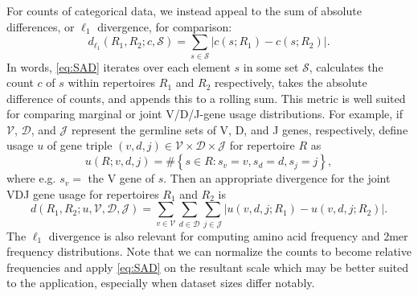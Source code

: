 \documentclass{article}
\begin{document}
For counts of categorical data, we instead appeal to the sum of absolute differences, or $\ell_1$ divergence, for comparison:
\begin{equation}\label{eq:SAD}
    d_{\ell_1}(R_1, R_2; c, \mathcal S) = \sum_{s \in \mathcal S} \left| c(s; R_1) - c(s; R_2) \right|.
\end{equation}
In words, \eqref{eq:SAD} iterates over each element $s$ in some set $\mathcal S$, calculates the count $c$ of $s$ within repertoires $R_1$ and $R_2$ respectively, takes the absolute difference of counts, and appends this to a rolling sum.
This metric is well suited for comparing marginal or joint V/D/J-gene usage distributions.
For example, if $\mathcal V$, $\mathcal D$, and $\mathcal J$ represent the germline sets of V, D, and J genes, respectively, define usage $u$ of gene triple $(v, d, j) \in \mathcal V \times \mathcal D \times \mathcal J$ for repertoire $R$ as
\begin{equation}
u(R; v, d, j) = \#\left\{s \in R: s_v = v, s_d = d, s_j = j\right\},
\end{equation}
where e.g. $s_v = $ the V gene of $s$.
Then an appropriate divergence for the joint VDJ gene usage for repertoires $R_1$ and $R_2$ is
\begin{equation}
d(R_1, R_2; u, \mathcal V, \mathcal D, \mathcal J) = \sum_{v \in \mathcal V} \sum_{d \in \mathcal D} \sum_{j \in \mathcal J} \left| u(v, d, j; R_1) - u(v, d, j; R_2) \right|.
\end{equation}
The $\ell_1$ divergence is also relevant for computing amino acid frequency and 2mer frequency distributions.
Note that we can normalize the counts to become relative frequencies and apply \eqref{eq:SAD} on the resultant scale which may be better suited to the application, especially when dataset sizes differ notably.
\end{document}

